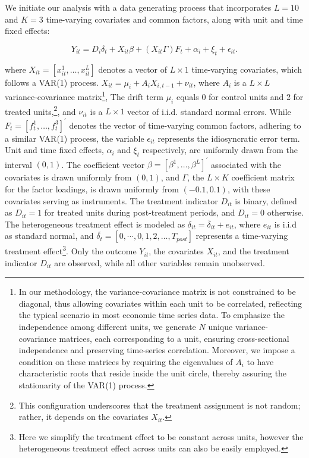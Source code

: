\documentclass[12pt]{article}
\begin{document}
We initiate our analysis with a data generating process that incorporates $L=10$ and $K=3$ time-varying covariates and common factors, along with unit and time fixed effects:

\begin{equation}
Y_{it} = D_{i} \delta_{t} + X_{it}\beta + (X_{it}\Gamma) F_{t} + \alpha_i + \xi_t + \epsilon_{it}.
\tag{6}
\label{eq: dgp}
\end{equation}

\noindent where $X_{it} = [x_{it}^1, \ldots, x_{it}^{L}]$ denotes a vector of $L \times 1$ time-varying covariates, which follows a VAR(1) process. $X_{it} = \mu_i + A_i X_{i,t-1} + \nu_{it}$, where $A_i$ is a $ L \times L$ variance-covariance matrix\footnote{In our methodology, the variance-covariance matrix is not constrained to be diagonal, thus allowing covariates within each unit to be correlated, reflecting the typical scenario in most economic time series data. To emphasize the independence among different units, we generate $N$ unique variance-covariance matrices, each corresponding to a unit, ensuring cross-sectional independence and preserving time-series correlation. Moreover, we impose a condition on these matrices by requiring the eigenvalues of $A_i$ to have characteristic roots that reside inside the unit circle, thereby assuring the stationarity of the VAR(1) process.}, The drift term $\mu_i$ equals 0 for control units and 2 for treated units,\footnote{This configuration underscores that the treatment assignment is not random; rather, it depends on the covariates $X_{it}$.}, and $\nu_{it}$ is a $L \times 1$ vector of i.i.d. standard normal errors. While $F_t = [f_t^1, \ldots, f_t^3]^\prime$ denotes the vector of time-varying common factors, adhering to a similar VAR(1) process, the variable $\epsilon_{it}$ represents the idiosyncratic error term. Unit and time fixed effects, $\alpha_i$ and $\xi_{t}$ respectively, are uniformly drawn from the interval $(0,1)$. The coefficient vector $\beta = [\beta^1, \ldots, \beta^{L}]^\prime$ associated with the covariates is drawn uniformly from $(0,1)$, and $\Gamma$, the $L \times K$ coefficient matrix for the factor loadings, is drawn uniformly from $(-0.1, 0.1)$, with these covariates serving as instruments. The treatment indicator $D_{it}$ is binary, defined as $D_{it} = 1$ for treated units during post-treatment periods, and $D_{it} = 0$ otherwise. The heterogeneous treatment effect is modeled as $\delta_{it} = \bar{\delta}_{it} + e_{it}$, where $e_{it}$ is i.i.d as standard normal, and $\bar{\delta_t} = [0, \cdots, 0, 1,2,\ldots,T_{post}]$ represents a time-varying treatment effect\footnote{Here we simplify the treatment effect to be constant across units, however the heterogeneous treatment effect across units can also be easily employed.}. Only the outcome $Y_{it}$, the covariates $X_{it}$, and the treatment indicator $D_{it}$ are observed, while all other variables remain unobserved.
\end{document}
